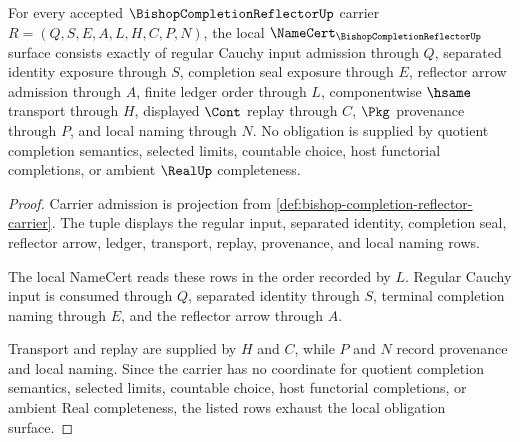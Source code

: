 \begin{theorem}\label{thm:bishop-completion-reflector-namecert-obligations}
For every accepted $\BishopCompletionReflectorUp$ carrier $R=(Q,S,E,A,L,H,C,P,N)$, the local $\NameCert_{\BishopCompletionReflectorUp}$ surface consists exactly of regular Cauchy input admission through $Q$, separated identity exposure through $S$, completion seal exposure through $E$, reflector arrow admission through $A$, finite ledger order through $L$, componentwise $\hsame$ transport through $H$, displayed $\Cont$ replay through $C$, $\Pkg$ provenance through $P$, and local naming through $N$. No obligation is supplied by quotient completion semantics, selected limits, countable choice, host functorial completions, or ambient $\RealUp$ completeness.
\end{theorem}
\begin{proof}
Carrier admission is projection from \autoref{def:bishop-completion-reflector-carrier}. The tuple displays the regular input, separated identity, completion seal, reflector arrow, ledger, transport, replay, provenance, and local naming rows.

The local NameCert reads these rows in the order recorded by $L$. Regular Cauchy input is consumed through $Q$, separated identity through $S$, terminal completion naming through $E$, and the reflector arrow through $A$.

Transport and replay are supplied by $H$ and $C$, while $P$ and $N$ record provenance and local naming. Since the carrier has no coordinate for quotient completion semantics, selected limits, countable choice, host functorial completions, or ambient Real completeness, the listed rows exhaust the local obligation surface.
\end{proof}

